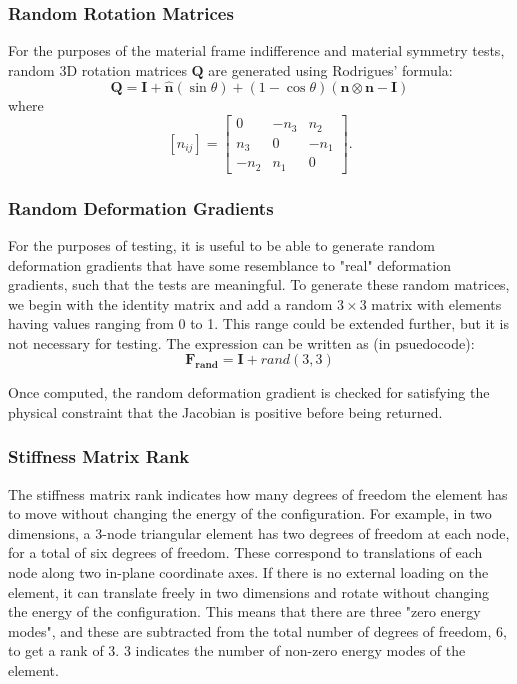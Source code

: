 \documentclass[]{spie}  %
\begin{document}
\subsubsection{Random Rotation Matrices}
For the purposes of the material frame indifference and material symmetry tests, random 3D rotation matrices $\bm{Q}$ are generated using Rodrigues' formula:
\begin{equation}
\label{eq: random rotation}
	\bm{Q} = \bm{I} + \bm{\hat{n}}(\sin\theta)  + (1 - \cos\theta)(\bm{n} \otimes \bm{n} - \bm{I})
\end{equation}
where
\begin{equation}
	\left[\hat{n}_{ij}\right] = 
	\begin{bmatrix}
		0		&	-n_3	&	n_2 \\
		n_3		&	0		&	-n_1 \\
		-n_2	& 	n_1		& 0
	\end{bmatrix} .
\end{equation}

\subsubsection{Random Deformation Gradients}
For the purposes of testing, it is useful to be able to generate random deformation gradients that have some resemblance to "real" deformation gradients, such that the tests are meaningful. To generate these random matrices, we begin with the identity matrix and add a random $3 \times 3$ matrix with elements having values ranging from 0 to 1. This range could be extended further, but it is not necessary for testing. The expression can be written as (in psuedocode):
\begin{equation}
\label{eq: random deformation gradient}
	\bm{F_{rand}} = \bm{I} + rand(3,3)
\end{equation}

Once computed, the random deformation gradient is checked for satisfying the physical constraint that the Jacobian is positive before being returned. 

\subsubsection{Stiffness Matrix Rank}
The stiffness matrix rank indicates how many degrees of freedom the element has to move without changing the energy of the configuration. For example, in two dimensions, a 3-node triangular element has two degrees of freedom at each node, for a total of six degrees of freedom. These correspond to translations of each node along two in-plane coordinate axes. If there is no external loading on the element, it can translate freely in two dimensions and rotate without changing the energy of the configuration. This means that there are three "zero energy modes", and these are subtracted from the total number of degrees of freedom, 6, to get a rank of 3. 3 indicates the number of non-zero energy modes of the element. 
\end{document}
